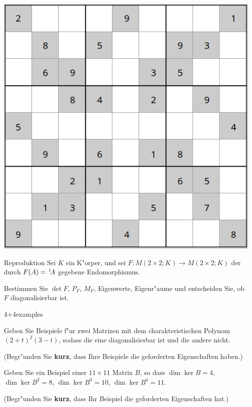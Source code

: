 \documentclass[a4paper]{article}
\begin{document}
\vspace{5mm}

\begin{center}
\includegraphics[width=.5\textwidth]{sudoku2}
\end{center}

\newpage


\begin{klaufg}{8}{Reproduktion}
  Sei $K$ ein K"orper, und sei $F \colon M(2 \times 2;K) \to M(2
  \times 2;K)$ der durch $F(A) = \,^t\!A$ gegebene
  Endomorphismus.

  Bestimmen Sie $\det F$, $P_F$, $M_F$, Eigenwerte, Eigenr"aume und
  entscheiden Sie, ob $F$ diagonalisierbar ist.
\end{klaufg}

\pagebreak
\begin{klaufg}{4+4}{examples}

  Geben Sie Beispiele f"ur zwei Matrizen mit dem charakteristischen Polynom
  $(2+t)^2(3-t)$, sodass die eine diagonalisierbar ist und die andere
  nicht.

  (Begr"unden Sie {\bfseries\sffamily kurz}, dass Ihre Beispiele die
  geforderten Eigenschaften haben.)
  \pagebreak
  
  Geben Sie ein Beispiel einer $11 \times 11$ Matrix $B$, so dass
  $\dim \ker B = 4$, $\dim \ker B^2 = 8$, $\dim \ker B^3 = 10$,
  $\dim \ker B^4 = 11$.
  
  (Begr"unden Sie {\bfseries\sffamily kurz}, dass Ihr Beispiel die
  geforderten Eigenschaften hat.)
\end{klaufg}
\end{document}

